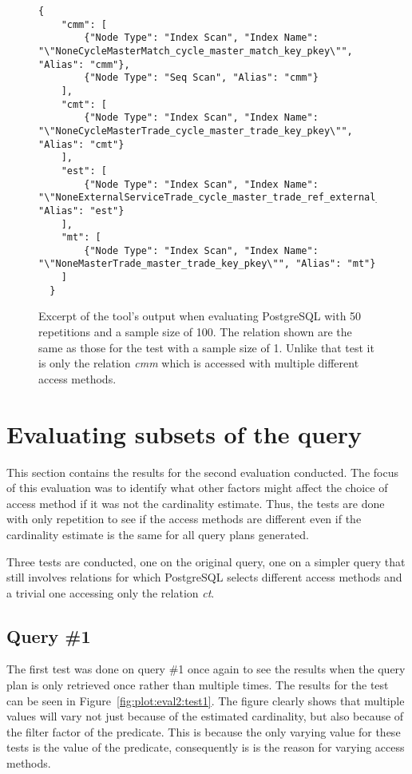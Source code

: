 \begin{figure}[ht]
  \begin{verbatim}
{
    "cmm": [
        {"Node Type": "Index Scan", "Index Name": "\"NoneCycleMasterMatch_cycle_master_match_key_pkey\"", "Alias": "cmm"},
        {"Node Type": "Seq Scan", "Alias": "cmm"}
    ],
    "cmt": [
        {"Node Type": "Index Scan", "Index Name": "\"NoneCycleMasterTrade_cycle_master_trade_key_pkey\"", "Alias": "cmt"}
    ],
    "est": [
        {"Node Type": "Index Scan", "Index Name": "\"NoneExternalServiceTrade_cycle_master_trade_ref_external_servic\"", "Alias": "est"}
    ],
    "mt": [
        {"Node Type": "Index Scan", "Index Name": "\"NoneMasterTrade_master_trade_key_pkey\"", "Alias": "mt"}
    ]
  }
\end{verbatim}
  \caption[Excerpt of the tool's output for PostgreSQL with 50 repetitions and a
  sample size of 100.]{Excerpt of the tool's output when evaluating PostgreSQL
    with 50 repetitions and a sample size of 100. The relation shown are the
    same as those for the test with a sample size of 1. Unlike that test it is
    only the relation \textit{cmm} which is accessed with multiple different
    access methods.}\label{fig:json:eval1:test3:postgresql}
\end{figure}

\section{Evaluating subsets of the query}\label{sec:subsets}
This section contains the results for the second evaluation conducted. The focus
of this evaluation was to identify what other factors might affect the choice of
access method if it was not the cardinality estimate. Thus, the tests are done
with only repetition to see if the access methods are different even if the
cardinality estimate is the same for all query plans generated.

Three tests are conducted, one on the original query, one on a simpler query
that still involves relations for which PostgreSQL selects different access
methods and a trivial one accessing only the relation \textit{ct}.

\subsection{Query \#1}
The first test was done on query \#1 once again to see the results when the
query plan is only retrieved once rather than multiple times. The results for
the test can be seen in Figure~\ref{fig:plot:eval2:test1}. The figure clearly
shows that multiple values will vary not just because of the estimated
cardinality, but also because of the filter factor of the predicate. This is
because the only varying value for these tests is the value of the predicate,
consequently is is the reason for varying access methods.

